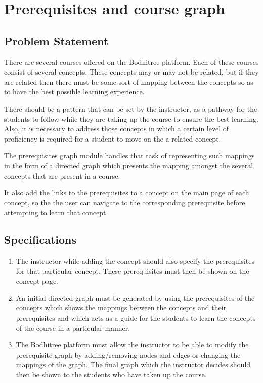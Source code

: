 \section{Prerequisites and course graph}

\subsection{Problem Statement}

\hspace{0.45cm} There are several courses offered on the Bodhitree platform. Each of these courses consist of several concepts. These concepts may or may not be related, but if they are related then there must be some sort of mapping between the concepts so as to have the best possible learning experience.
\par There should be a pattern that can be set by the instructor, as a pathway for the students to follow while they are taking up the course to ensure the best learning. Also, it is necessary to address those concepts in which a certain level of proficiency is required for a student to move on the a related concept.
\par The prerequisites graph module handles that task of representing such mappings in the form of a directed graph which presents the mapping amongst the several concepts that are present in a course.
\par It also add the links to the prerequisites to a concept on the main page of each concept, so the the user can navigate to the corresponding prerequisite before attempting to learn that concept.

\subsection{Specifications}

\begin{enumerate}
	
	\item The instructor while adding the concept should also specify the prerequisites for that particular concept. These prerequisites must then be shown on the concept page.
	
	\item An initial directed graph must be generated by using the prerequisites of the concepts which shows the mappings between the concepts and their prerequisites and which acts as a guide for the students to learn the concepts of the course in a particular manner.
	
	\item The Bodhitree platform must allow the instructor to be able to modify the prerequisite graph by adding/removing nodes and edges or changing the mappings of the graph. The final graph which the instructor decides should then be shown to the students who have taken up the course.

\end{enumerate}

